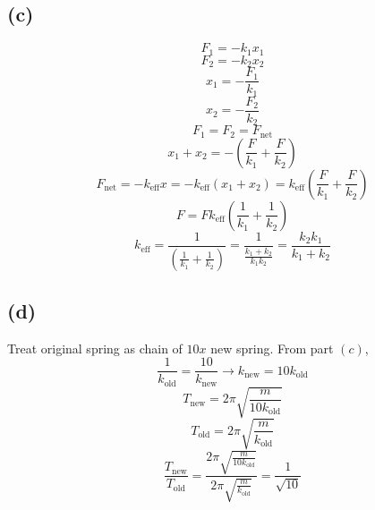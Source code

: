 \documentclass[letter]{article}
\begin{document}
\subsection*{(c)} 
\[
F_1 = - k_1 x_1
\] 
\[
F_2 = - k_2 x_2
\] 
\[
x_1 = - \frac{F_1}{k_1}
\] 
\[
x_2 = - \frac{F_2}{k_2}
\] 
\[
	F_1 = F_2 = F_\text{net} 
\]
\[
x_1 + x_2 = - \left(\frac{F}{k_1} + \frac{F}{k_2}\right)
\] 
\[
F_\text{net} = - k_\text{eff} x = - k_\text{eff} (x_1 + x_2) = k_\text{eff} \left(\frac{F}{k_1} + \frac{F}{k_2}\right)
\] 
\[
F = F k_\text{eff} \left(\frac{1}{k_1} + \frac{1}{k_2}\right)
\] 
\[
k_\text{eff} = \frac{1}{\left(\frac{1}{k_1} + \frac{1}{k_2}\right) } = \frac{1}{ \frac{k_1 + k_2}{k_1 k_2}} = \frac{k_2 k_1}{k_1 + k_2}
\]

\subsection*{(d)} 
Treat original spring as chain of $10 x$ new spring. From part $(c)$, 
\[
\frac{1}{k_\text{old}} = \frac{10}{k_\text{new} } \to  k_\text{new} = 10 k_\text{old}
\]
\[
T_\text{new} = 2 \pi \sqrt{\frac{m}{10 k_\text{old}}} 
\]
\[
T_\text{old} = 2 \pi \sqrt{\frac{m}{k_\text{old}}} 
\] 
\[
\frac{T_\text{new}}{T_\text{old}} = \frac{2 \pi \sqrt{\frac{m}{10 k_\text{old}}} }{2 \pi \sqrt{\frac{m}{k_\text{old}}} } = \frac{1}{\sqrt{10} }
\] 
\end{document}
